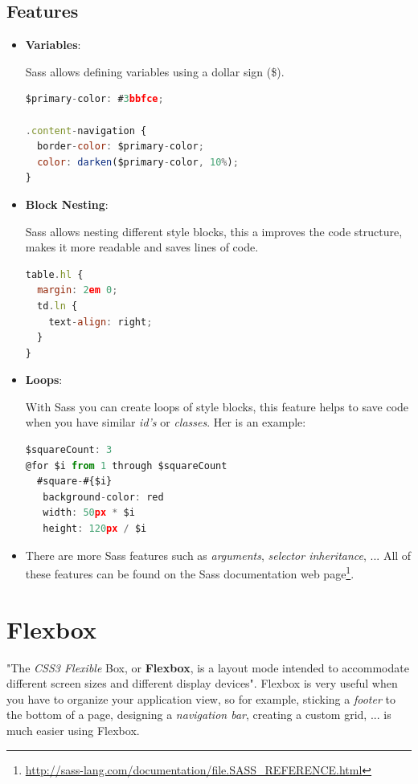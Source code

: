 \documentclass[a4paper, 12pt, english]{book}
\begin{document}
\subsection{Features}
\label{sec:sass-features}
\begin{itemize}
    \item \textbf{Variables}:

        Sass allows defining variables using a dollar sign (\$).
        \begin{lstlisting}[language=javascript]
$primary-color: #3bbfce;

.content-navigation {
  border-color: $primary-color;
  color: darken($primary-color, 10%);
}
        \end{lstlisting}

    \item \textbf{Block Nesting}:

        Sass allows nesting different style blocks, this a improves the code structure, makes it more readable and saves lines of code.
        \begin{lstlisting}[language=javascript]
table.hl {
  margin: 2em 0;
  td.ln {
    text-align: right;
  }
}
        \end{lstlisting}

    \item \textbf{Loops}:

        With Sass you can create loops of style blocks, this feature helps to save code when you have similar \textit{id's} or \textit{classes}. Her is an example:
        \begin{lstlisting}[language=javascript]
$squareCount: 3
@for $i from 1 through $squareCount
  #square-#{$i}
   background-color: red
   width: 50px * $i
   height: 120px / $i
        \end{lstlisting}

    \item There are more Sass features such as \textit{arguments}, \textit{selector inheritance}, ... All of these features can be found on the Sass documentation web page\footnote{\url{http://sass-lang.com/documentation/file.SASS_REFERENCE.html}}.
\end{itemize}


\section{Flexbox}
\label{sec:flexbox}

"The \textit{CSS3 Flexible} Box, or \textbf{Flexbox}, is a layout mode intended to accommodate different screen sizes and different display devices". Flexbox is very useful when you have to organize your application view, so for example, sticking a \textit{footer} to the bottom of a page, designing a \textit{navigation bar}, creating a custom grid, ... is much easier using Flexbox.
\end{document}
